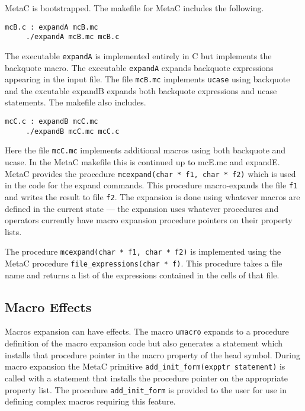\documentclass{article}
\begin{document}
MetaC is bootstrapped.  The makefile for MetaC includes the following.
\begin{verbatim}
mcB.c : expandA mcB.mc
	 ./expandA mcB.mc mcB.c
\end{verbatim}
The executable {\tt expandA} is implemented entirely in C but implements the backquote macro.  The executable {\tt expandA}
expands backquote expressions appearing in the input file. The file {\tt mcB.mc} implements {\tt ucase} using backquote
and the excutable expandB expands both backquote expressions and ucase statements.
The makefile also includes.
\begin{verbatim}
mcC.c : expandB mcC.mc
	 ./expandB mcC.mc mcC.c
\end{verbatim}
Here the file {\tt mcC.mc} implements additional macros using both backquote and ucase.  In the MetaC makefile this is continued up to mcE.mc and expandE.
MetaC provides the procedure
{\tt mcexpand(char * f1, char * f2)} which is used in the code for the expand commands.  This procedure macro-expands the
file {\tt f1} and writes the result to file {\tt f2}.  The expansion is done using whatever macros are defined
in the current state --- the expansion uses whatever procedures and operators currently
have macro expansion procedure pointers on their property lists.

The procedure {\tt mcexpand(char * f1, char * f2)} is implemented using the MetaC procedure {\tt file\_expressions(char * f)}.
This procedure takes a file name and returns a list of the expressions contained in the cells of that file.

\subsection{Macro Effects}


Macros expansion can have effects.  The macro {\tt umacro} expands to a procedure definition of the macro expansion code but also
generates a statement which installs that procedure pointer in the macro property of the head symbol.  During macro expansion the
MetaC primitive {\tt add\_init\_form(expptr statement)} is called with a statement that installs the procedure pointer on the appropriate property list.  The procedure {\tt add\_init\_form} is provided to the user for use in defining complex macros
requiring this feature.
\end{document}
